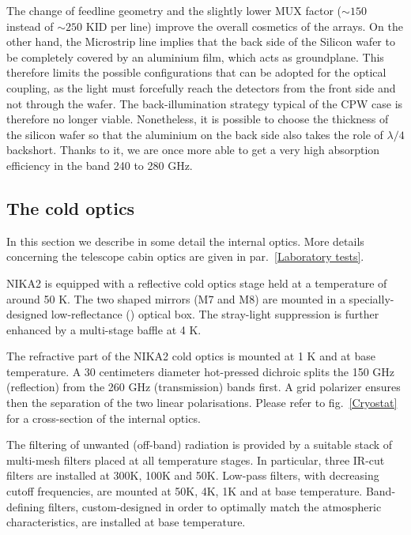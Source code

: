 \documentclass[]{aa} %
\begin{document}
The change of feedline geometry and the slightly lower MUX factor ($\sim150$ instead of $\sim250$ KID per line) improve the overall cosmetics of the arrays. On the other hand, the Microstrip line implies that the back side of the Silicon wafer to be completely covered by an aluminium film, which acts as groundplane. This therefore limits the possible configurations that can be adopted for the optical coupling, as the light must forcefully reach the detectors from the front side and not through the wafer. The back-illumination strategy typical of the CPW case is therefore no longer viable. Nonetheless, it is possible to choose the thickness of the silicon wafer so that the aluminium on the back side also takes the role of $\lambda/4$ backshort. Thanks to it, we are once more able to get a very high absorption efficiency in the band 240 to 280 GHz. 


 \subsection{The cold optics}

In this section we describe in some detail the internal optics. More details concerning the telescope cabin optics are given in par.~\ref{Laboratory tests}.

NIKA2 is equipped with a reflective cold optics stage held at a temperature of around 50 K. The two shaped mirrors (M7 and M8) are mounted in a specially-designed low-reflectance (\cite{Calvo2010}) optical box. The stray-light suppression is further enhanced by a multi-stage baffle at 4 K.

The refractive part of the NIKA2 cold optics is mounted at 1 K and at base temperature. A 30 centimeters diameter hot-pressed dichroic splits the 150 GHz (reflection) from the 260 GHz (transmission) bands first. A grid polarizer ensures then the separation of the two linear polarisations.  Please refer to fig.~\ref{Cryostat} for a cross-section of the internal optics.
 

The filtering of unwanted (off-band) radiation is provided by a suitable stack of multi-mesh filters placed at all temperature stages. In particular, three IR-cut filters are installed at 300K, 100K and 50K. Low-pass filters, with decreasing cutoff frequencies, are mounted at 50K, 4K, 1K and at base temperature. Band-defining filters, custom-designed in order to optimally match the atmospheric characteristics, are installed at base temperature. 
\end{document}
